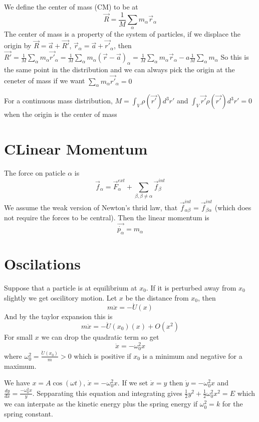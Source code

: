 \documentclass{homework}
\begin{document}
We define the center of mass (CM) to be at
\[\vec{R} = \frac{1}{M}\sum_{\alpha}m_{\alpha}\vec{r}_{\alpha}\]
The center of mass is a property of the system of particles, if we displace the origin by $\vec{R} = \vec{a} + \vec{R'}$, $\vec{r}_{\alpha} = \vec{a} + \vec{r'}_{\alpha}$, then $\vec{R'} = \frac{1}{M}\sum_{\alpha}m_{\alpha}\vec{r'}_{\alpha} = \frac{1}{M}\sum_{\alpha}m_{\alpha}(\vec{r} - \vec{a})_{\alpha} = \frac{1}{M}\sum_{\alpha}m_{\alpha}\vec{r}_{\alpha} -a\frac{1}{M}\sum_{\alpha} m_{\alpha}$
So this is the same point in the distribution and we can always pick the origin at the ceneter of mass if we want $\sum_{\alpha}m_{\alpha}\vec{r'}_{\alpha} = 0$


For a continuous mass distribution, $M = \int_{V} \rho(\vec{r'})d^3r'$ and $ \int_{V} \vec{r'}\rho(\vec{r'})d^3r' = 0$ when the origin is the center of mass

\section{CLinear Momentum}

The force on paticle $\alpha$ is 
\[\vec{f}_{\alpha} = \vec{F}_{\alpha}^{ext} + \sum_{\beta, \beta \neq \alpha}\vec{f}_{\beta}^{int}\]
We assume the weak version of Newton's thrid law, that $\vec{f}_{\alpha\beta}^{int} = \vec{f}_{\beta\alpha}^{int}$ (which does not require the forces to be central). Then the linear momentum is
\[\vec{\dot{p_{\alpha}}} = m_{\alpha}\]



\section{Oscilations}

Suppose that a particle is at equilibrium at $x_0$. If it is perturbed away from $x_0$ slightly we get oscilitory motion. Let $x$ be the distance from $x_0$, then
\[m\ddot x = -\dot U (x)\]
And by the taylor expansion this is
\[m\ddot x = -\ddot U(x_0)(x) + O(x^2)\]
For small $x$ we can drop the quadratic term so get
\[\ddot x = -\omega_0^2 x\]
where $\omega_0^2 = \frac{\ddot U(x_0)}{m} > 0$ which is positive if $x_0$ is a minimum and negative for a maximum. 

We have $x = A \cos (\omega t)$, $\dot x = -\omega_0^2 x$. If we set $\dot x = y$ then $\dot y = -\omega_0^2 x$ and $\frac{dy}{dx} = \frac{-\omega_0^2 x}{y}$. Sepparating this equation and integrating gives $\frac{1}{2}y^2 + \frac{1}{2}\omega_0^2x^2 = E$ which we can interpate as the kinetic energy plus the spring energy if $\omega_0^2 = k$ for the spring constant. 
\end{document}
